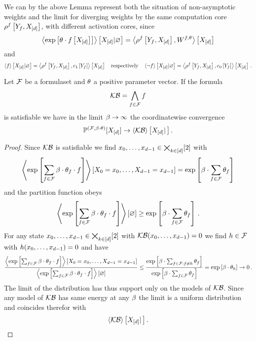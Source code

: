 We can by the above Lemma represent both the situation of non-asymptotic weights and the limit for diverging weights by the same computation core $\rho^{f}\left[Y_{f},X_{[d]}\right]$, with different activation cores, since
\begin{align*}
	\left\langle \mathrm{exp}\left[\theta\cdot f\left[X_{[d]}\right]\right]\right\rangle \left[ X_{[d]} | \varnothing \right] 
	= \left\langle \rho^{f}\left[Y_{f},X_{[d]}\right],W^{f,\theta}\right\rangle \left[ X_{[d]} \right]
\end{align*}
and 
\begin{align*}
	\left\langle f\right\rangle \left[ X_{[d]} | \varnothing \right]
	= \left\langle \rho^{f}\left[Y_{f},X_{[d]}\right],e_1\left[Y_{f}\right]\right\rangle \left[ X_{[d]} \right] \quad \text{respectively} \quad
	\left\langle \lnot f\right\rangle \left[ X_{[d]} | \varnothing \right]
	= \left\langle \rho^{f}\left[Y_{f},X_{[d]}\right],e_0\left[Y_{f}\right]\right\rangle \left[ X_{[d]} \right] \, . 
\end{align*}



\begin{theorem}
	Let $\mathcal{F}$ be a formulaset and $\theta$ a positive parameter vector.
	If the formula
		\[ \mathcal{KB} = \bigwedge_{f\in\mathcal{F}} f \]
	is satisfiable we have in the limit $\beta\rightarrow\infty$ the coordinatewise convergence
		\[ \mathbb{P}^{(\mathcal{F},\beta\cdot\theta)}[X_{[d]}] \rightarrow \left\langle \mathcal{KB}\right\rangle \left[ X_{[d]} | \, \right] . \]
\end{theorem}
\begin{proof}
	Since $\mathcal{KB}$ is satisfiable we find $x_{0},\ldots,x_{d-1}\in\bigtimes_{k\in[d]}[2]$ with
		\[  \left\langle \mathrm{exp}\left[\sum_{f\in\mathcal{F}}\beta\cdot \theta_{f} \cdot f\right]\right\rangle \left[ X_{0}=x_{0},\ldots,X_{d-1}=x_{d-1} \right] = \mathrm{exp}\left[\beta \cdot \sum_{f\in\mathcal{F}}\theta_{f}\right]  \]
	and the partition function obeys
		\[ \left\langle \mathrm{exp}\left[\sum_{f\in\mathcal{F}}\beta\cdot \theta_{f} \cdot f\right]\right\rangle \left[ \varnothing \right] \geq  \mathrm{exp}\left[\beta \cdot \sum_{f\in\mathcal{F}}\theta_{f}\right]  \, . \]
	For any state $x_{0},\ldots,x_{d-1}\in\bigtimes_{k\in[d]}[2]$ with $\mathcal{KB}(x_{0},\ldots,x_{d-1})=0$ we find $h\in\mathcal{F}$ with $h(x_{0},\ldots,x_{d-1})=0$ and have
	\begin{align*}
	 	\frac{
		\left\langle \mathrm{exp}\left[\sum_{f\in\mathcal{F}}\beta\cdot \theta_{f} \cdot f\right]\right\rangle \left[ X_{0}=x_{0},\ldots,X_{d-1}=x_{d-1} \right]
		}{
		\left\langle \mathrm{exp}\left[\sum_{f\in\mathcal{F}}\beta\cdot \theta_{f} \cdot f\right]\right\rangle \left[ \varnothing \right]
		} 
		\leq  
	 	\frac{
		\mathrm{exp}\left[\beta\cdot \sum_{f\in\mathcal{F} : f\neq h}\theta_{f}\right]
		}{
		\mathrm{exp}\left[\beta\cdot \sum_{f\in\mathcal{F}}\theta_{f}\right]
		} 
		= \mathrm{exp}\left[\beta \cdot \theta_{h}\right] \rightarrow 0 \, . 
	\end{align*}
	The limit of the distribution has thus support only on the models of $\mathcal{KB}$. 
	Since any model of $\mathcal{KB}$ has same energy at any $\beta$ the limit is a uniform distribution and coincides therefor with
		\[ \left\langle \mathcal{KB}\right\rangle \left[ X_{[d]} | \, \right] . \]
\end{proof}



